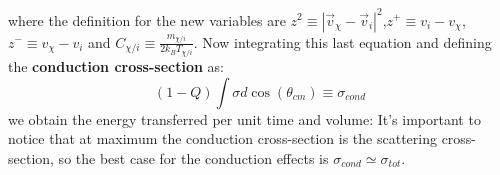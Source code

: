 where the definition for the new variables are $z^2\equiv|\Vec{v}_{\chi}-\Vec{v}_i|^2$,$z^+\equiv v_i-v_{\chi}$, $z^-\equiv v_{\chi}-v_{i}$ and $C_{\chi/i}\equiv \frac{m_{\chi/i}}{2k_B T_{\chi/i}}$. Now integrating this last equation and defining the \textbf{conduction cross-section} as:
\begin{equation*}
    (1-Q)\int\sigma d\cos(\theta_{cm})\equiv \sigma_{cond}
\end{equation*} 
we obtain the energy transferred per unit time and volume:
It's important to notice that at maximum the conduction cross-section is the scattering cross-section, so the best case for the conduction effects is $\sigma_{cond}\simeq \sigma_{tot}$.